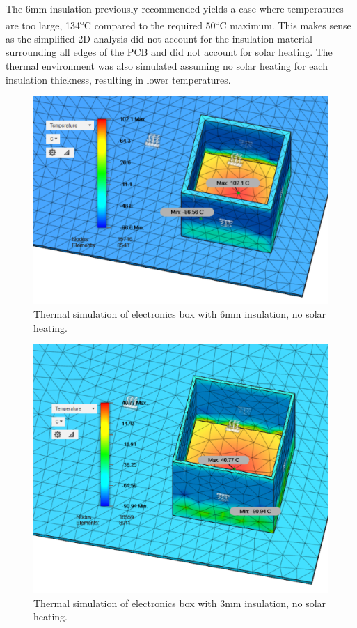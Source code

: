 The 6mm insulation previously recommended yields a case where temperatures are too large, 134\textsuperscript{o}C compared to the required 50\textsuperscript{o}C maximum. This makes sense as the simplified 2D analysis did not account for the insulation material surrounding all edges of the PCB and did not account for solar heating. The thermal environment was also simulated assuming no solar heating for each insulation thickness, resulting in lower temperatures.\\

	\begin{figure}[H]
    \centering	
	\includegraphics[scale=0.58]{4-experiment-design/img/mechanical/6mmthicknoheat.PNG}
	\caption{Thermal simulation of electronics box with 6mm insulation, no solar heating.}
	\label{fig:6mmthicknoheat}
    	\end{figure}

	\begin{figure}[H]
    \centering    	
    \includegraphics[scale=0.6]{4-experiment-design/img/mechanical/3mmthicknoheat.PNG}
	\caption{Thermal simulation of electronics box with 3mm insulation, no solar heating.}
	\label{fig:3mmthicknoheat}
	\end{figure}

